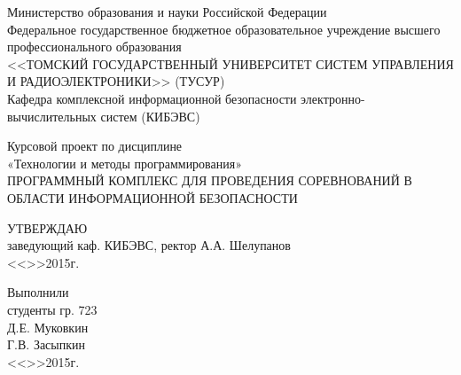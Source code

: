 \newpage
{}

\begin{center}
 Министерство образования и науки Российской Федерации\\
 Федеральное государственное бюджетное образовательное учреждение высшего профессионального образования\\
 <<ТОМСКИЙ ГОСУДАРСТВЕННЫЙ УНИВЕРСИТЕТ СИСТЕМ УПРАВЛЕНИЯ И РАДИОЭЛЕКТРОНИКИ>> (ТУСУР)\\
 Кафедра комплексной информационной безопасности электронно-вычислительных систем (КИБЭВС)\\
\end{center}


\begin{center}
Курсовой проект по дисциплине \\
«Технологии и методы программирования» \\
ПРОГРАММНЫЙ КОМПЛЕКС ДЛЯ ПРОВЕДЕНИЯ СОРЕВНОВАНИЙ В ОБЛАСТИ ИНФОРМАЦИОННОЙ БЕЗОПАСНОСТИ
\end{center}
\vfill

\begin{flushleft}
\begin{minipage}{0.45\textwidth}
 \begin{flushright}
  УТВЕРЖДАЮ\\
  заведующий каф. КИБЭВС, ректор
  \underline{\hspace{3cm}}А.А. Шелупанов \\
  <<\underline{\hspace{1cm}}>>\underline{\hspace{3cm}}2015г.\\
 \end{flushright}
\end{minipage}
\end{flushleft}

\vfill

\vfill
\begin{flushright}
\begin{minipage}{0.45\textwidth}
 \begin{flushleft}
  Выполнили \\
  студенты гр. 723 \\
  \underline{\hspace{3cm}}Д.Е. Муковкин \\
  \underline{\hspace{3cm}}Г.В. Засыпкин \\
  <<\underline{\hspace{1cm}}>>\underline{\hspace{3cm}}2015г.\\
 \end{flushleft}
\end{minipage}
\end{flushright}

